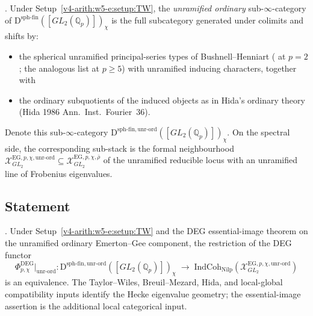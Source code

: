 \begin{definition}
\label{v4-arith:w5-e:def:unr-ord}
\ClaimStatusDefinitional. Under Setup~\ref{v4-arith:w5-e:setup:TW},
the \emph{unramified ordinary} sub-\(\infty\)-category of
\(\mathrm{D}^{\mathrm{sph\text{-}fin}}([GL_{2}(\mathbb{Q}_{p})])_{\chi}\)
is the full subcategory generated under colimits and shifts by:
\begin{itemize}
\item the spherical unramified principal-series types of
Bushnell--Henniart ( at
\(p=2\); the analogous list at \(p\geq 5\)) with unramified inducing
characters, together with
\item the ordinary subquotients of the induced objects as in
Hida's ordinary theory (Hida 1986 Ann.~Inst.~Fourier~36).
\end{itemize}
Denote this sub-\(\infty\)-category
\(\mathrm{D}^{\mathrm{sph\text{-}fin,unr\text{-}ord}}([GL_{2}(\mathbb{Q}_{p})])_{\chi}\).
On the spectral side, the corresponding sub-stack is the
formal neighbourhood
\(\mathcal{X}^{\mathrm{EG},p,\chi,\mathrm{unr\text{-}ord}}_{GL_{2}}\subseteq
\mathcal{X}^{\mathrm{EG},p,\chi,\bar\rho}_{GL_{2}}\) of the
unramified reducible locus with an unramified line of Frobenius
eigenvalues.
\end{definition}

\subsection{Statement}

\begin{theorem}
\label{v4-arith:w5-e:thm:f1a1-ordinary}
\ClaimStatusProvedHereConditional. Under Setup~\ref{v4-arith:w5-e:setup:TW}
and the DEG essential-image theorem on the unramified ordinary
Emerton--Gee component, the
restriction of the DEG functor
\[
\Phi^{\mathrm{DEG}}_{p,\chi}\bigr|_{\mathrm{unr\text{-}ord}}\colon
\mathrm{D}^{\mathrm{sph\text{-}fin,unr\text{-}ord}}([GL_{2}(\mathbb{Q}_{p})])_{\chi}
\;\longrightarrow\;
\mathrm{IndCoh}_{\mathrm{Nilp}}(\mathcal{X}^{\mathrm{EG},p,\chi,\mathrm{unr\text{-}ord}}_{GL_{2}})
\]
is an equivalence. The Taylor--Wiles, Breuil--Mezard, Hida, and
local-global compatibility inputs identify the Hecke eigenvalue
geometry; the essential-image assertion is the additional local
categorical input.
\end{theorem}

